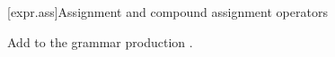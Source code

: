 %
%
%
%
%	
%

\setcounter{section}{16}
[expr.ass]{Assignment and compound assignment operators}%

Add  to the grammar production .

